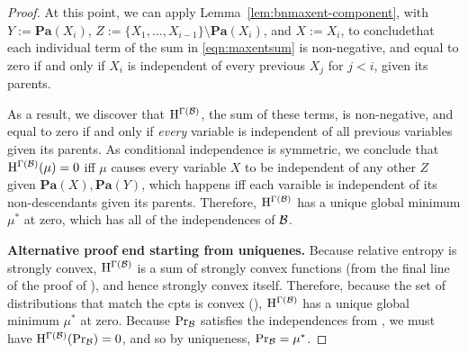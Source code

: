 \documentclass{article}
\def\Pa{\mathbf{Pa}}
\begin{document}
\begin{proof}
	At this point, we can apply Lemma~\ref{lem:bnmaxent-component},
	with $Y := \Pa(X_i)$, $Z := \{X_1, \ldots, X_{i-1}\} \setminus \Pa(X_i)$, and $X := X_i$, to conclude\footnotemark that each individual term of the sum in \eqref{eqn:maxentsum} is non-negative, and equal to zero if and only if $X_i$ is independent of every previous $X_j$ for $j < i$, given its parents. 
	
	
	As a result, we discover that $\mathrm{H}^{\Gamma(\mathcal B)}$, the sum of these terms, is non-negative, and equal to zero if and only if \emph{every} variable is independent of all previous variables given its parents. 
	As conditional independence is symmetric, we conclude that $\mathrm{H}^{\Gamma(\mathcal B)}(\mu) = 0$ iff $\mu$ causes every variable $X$ to be independent of any other $Z$ given $\Pa(X), \Pa(Y)$, which happens iff each varaible is independent of its non-descendants given its parents. Therefore, $\mathrm{H}^{\Gamma(\mathcal B)}$ has a unique global minimum $\mu^*$ at zero, which has all of the independences of $\cal B$.
	
	
	\textbf{Alternative proof end starting from uniquenes.}	
	Because relative entropy is strongly convex, $\mathrm{H}^{\Gamma(\mathcal B)}$ is a sum of strongly convex functions (from the final line of the proof of ), and hence strongly convex itself. Therefore, because the set of distributions that match the cpts is convex (), $\mathrm{H}^{\Gamma(\mathcal B)}$ has a unique global minimum $\mu^*$ at zero. Because $\Pr_{\cal B}$ satisfies the independences from , we must have $\mathrm{H}^{\Gamma(\mathcal B)}(\Pr_{\cal B}) = 0$, and so by uniqueness, $\Pr_{\cal B} = \mu^*$.
\end{proof}

\clearpage
\end{document}
